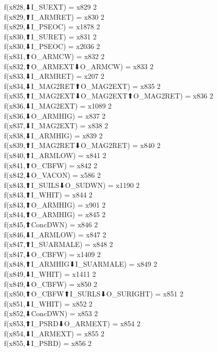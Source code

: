 f(x828,⬇I_SUEXT) = x829 {2} \\
f(x829,⬆I_ARMRET) = x830 {2} \\
f(x829,⬇I_PSEOC) = x1878 {2} \\
f(x830,⬆I_SURET) = x831 {2} \\
f(x830,⬇I_PSEOC) = x2036 {2} \\
f(x831,⬆O_ARMCW) = x832 {2} \\
f(x832,⬆O_ARMEXT⬇O_ARMCW) = x833 {2} \\
f(x833,⬇I_ARMRET) = x207 {2} \\
f(x834,⬇I_MAG2RET⬆O_MAG2EXT) = x835 {2} \\
f(x835,⬆I_MAG2EXT⬇O_MAG2EXT⬆O_MAG2RET) = x836 {2} \\
f(x836,⬇I_MAG2EXT) = x1089 {2} \\
f(x836,⬇O_ARMHIG) = x837 {2} \\
f(x837,⬇I_MAG2EXT) = x838 {2} \\
f(x838,⬇I_ARMHIG) = x839 {2} \\
f(x839,⬆I_MAG2RET⬇O_MAG2RET) = x840 {2} \\
f(x840,⬆I_ARMLOW) = x841 {2} \\
f(x841,⬆O_CBFW) = x842 {2} \\
f(x842,⬇O_VACON) = x586 {2} \\
f(x843,⬆I_SUILS⬇O_SUDWN) = x1190 {2} \\
f(x843,⬆I_WHIT) = x844 {2} \\
f(x843,⬆O_ARMHIG) = x901 {2} \\
f(x844,⬆O_ARMHIG) = x845 {2} \\
f(x845,⬆ConcDWN) = x846 {2} \\
f(x846,⬇I_ARMLOW) = x847 {2} \\
f(x847,⬆I_SUARMALE) = x848 {2} \\
f(x847,⬇O_CBFW) = x1409 {2} \\
f(x848,⬆I_ARMHIG⬇I_SUARMALE) = x849 {2} \\
f(x849,⬇I_WHIT) = x1411 {2} \\
f(x849,⬇O_CBFW) = x850 {2} \\
f(x850,⬆O_CBFW⬆I_SURLS⬇O_SURIGHT) = x851 {2} \\
f(x851,⬇I_WHIT) = x852 {2} \\
f(x852,⬇ConcDWN) = x853 {2} \\
f(x853,⬆I_PSRD⬇O_ARMEXT) = x854 {2} \\
f(x854,⬇I_ARMEXT) = x855 {2} \\
f(x855,⬇I_PSRD) = x856 {2} \\
